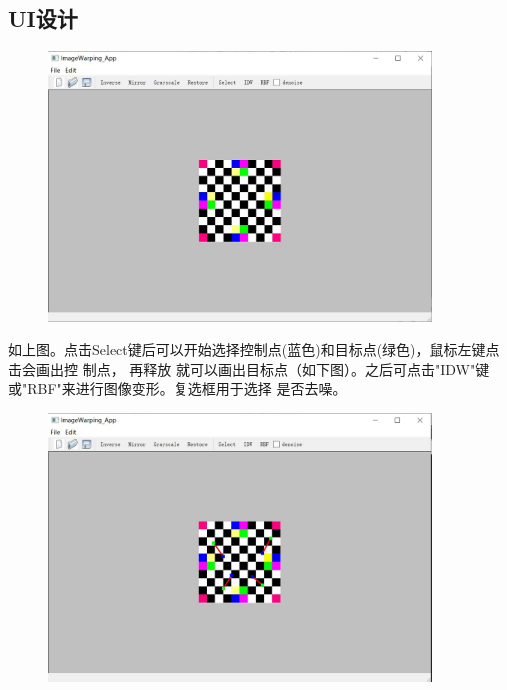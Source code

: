 \documentclass{article}
\begin{document}
	\subsection{UI设计}
	\begin{figure}[htb]
		\begin{center}
		\includegraphics[width=4in]{ui.jpg}
		\end{center}
	\end{figure}
	如上图。点击Select键后可以开始选择控制点(蓝色)和目标点(绿色)，鼠标左键点击会画出控
	制点，
	再释放
	就可以画出目标点（如下图）。之后可点击"IDW"键或"RBF"来进行图像变形。复选框用于选择
	是否去噪。
	\begin{figure}[htb]
		\begin{center}
			\includegraphics[width=4in]{ui1.jpg}
		\end{center}
	\end{figure}
	\clearpage
\end{document}

